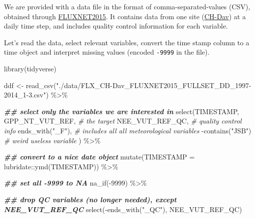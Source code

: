 \documentclass[
]{book}
\newenvironment{Shaded}{\begin{snugshade}}{\end{snugshade}}
\newcommand{\AttributeTok}[1]{\textcolor[rgb]{0.77,0.63,0.00}{#1}}
\newcommand{\CommentTok}[1]{\textcolor[rgb]{0.56,0.35,0.01}{\textit{#1}}}
\newcommand{\DecValTok}[1]{\textcolor[rgb]{0.00,0.00,0.81}{#1}}
\newcommand{\DocumentationTok}[1]{\textcolor[rgb]{0.56,0.35,0.01}{\textbf{\textit{#1}}}}
\newcommand{\FunctionTok}[1]{\textcolor[rgb]{0.00,0.00,0.00}{#1}}
\newcommand{\NormalTok}[1]{#1}
\newcommand{\OtherTok}[1]{\textcolor[rgb]{0.56,0.35,0.01}{#1}}
\newcommand{\SpecialCharTok}[1]{\textcolor[rgb]{0.00,0.00,0.00}{#1}}
\newcommand{\StringTok}[1]{\textcolor[rgb]{0.31,0.60,0.02}{#1}}
\begin{document}
We are provided with a data file in the format of comma-separated-values (CSV), obtained through \href{https://fluxnet.org/data/fluxnet2015-dataset/}{FLUXNET2015}. It contains data from one site (\href{https://gl.ethz.ch/infrastructure/sites/davos.html}{CH-Dav}) at a daily time step, and includes quality control information for each variable.

Let's read the data, select relevant variables, convert the time stamp column to a time object and interpret missing values (encoded \texttt{-9999} in the file).

\begin{Shaded}
\begin{Highlighting}[]
\FunctionTok{library}\NormalTok{(tidyverse)}

\NormalTok{ddf }\OtherTok{\textless{}{-}} \FunctionTok{read\_csv}\NormalTok{(}\StringTok{"./data/FLX\_CH{-}Dav\_FLUXNET2015\_FULLSET\_DD\_1997{-}2014\_1{-}3.csv"}\NormalTok{) }\SpecialCharTok{\%\textgreater{}\%} 
  
  \DocumentationTok{\#\# select only the variables we are interested in}
  \FunctionTok{select}\NormalTok{(TIMESTAMP,}
\NormalTok{         GPP\_NT\_VUT\_REF,    }\CommentTok{\# the target}
\NormalTok{         NEE\_VUT\_REF\_QC,    }\CommentTok{\# quality control info}
         \FunctionTok{ends\_with}\NormalTok{(}\StringTok{"\_F"}\NormalTok{),   }\CommentTok{\# includes all all meteorological variables}
         \SpecialCharTok{{-}}\FunctionTok{contains}\NormalTok{(}\StringTok{"JSB"}\NormalTok{)   }\CommentTok{\# weird useless variable}
\NormalTok{         ) }\SpecialCharTok{\%\textgreater{}\%}

  \DocumentationTok{\#\# convert to a nice date object}
  \FunctionTok{mutate}\NormalTok{(}\AttributeTok{TIMESTAMP =}\NormalTok{ lubridate}\SpecialCharTok{::}\FunctionTok{ymd}\NormalTok{(TIMESTAMP)) }\SpecialCharTok{\%\textgreater{}\%}

  \DocumentationTok{\#\# set all {-}9999 to NA}
  \FunctionTok{na\_if}\NormalTok{(}\SpecialCharTok{{-}}\DecValTok{9999}\NormalTok{) }\SpecialCharTok{\%\textgreater{}\%}

  \DocumentationTok{\#\# drop QC variables (no longer needed), except NEE\_VUT\_REF\_QC}
  \FunctionTok{select}\NormalTok{(}\SpecialCharTok{{-}}\FunctionTok{ends\_with}\NormalTok{(}\StringTok{"\_QC"}\NormalTok{), NEE\_VUT\_REF\_QC)}
\end{Highlighting}
\end{Shaded}
\end{document}
